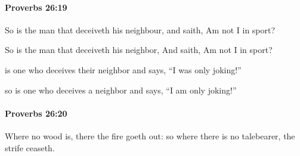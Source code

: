 		\paragraph{Proverbs 26:19} %
			\label{PROVERBS-26-19}

			So is the man that deceiveth his neighbour, and saith, Am not I in sport?

			\begin{versebox}
					\item[BHS] 
					\item[ASV] So is the man that deceiveth his neighbor, And saith, Am not I in sport?
					\item[NIV] is one who deceives their neighbor and says, “I was only joking!”
					\item[NRSV] so is one who deceives a neighbor and says, “I am only joking!”
			\end{versebox}

		\paragraph{Proverbs 26:20} %
			\label{PROVERBS-26-20}

			Where no wood is, there the fire goeth out: so where there is no talebearer, the strife ceaseth.

